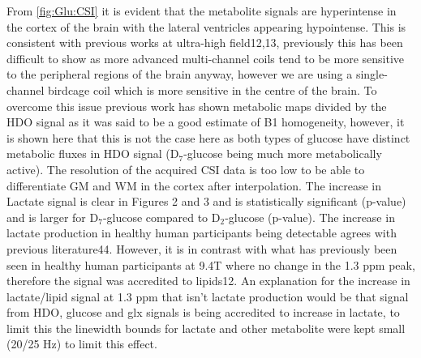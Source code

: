 \documentclass[class=article, crop=false]{standalone}
\begin{document}
From \ref{fig:Glu:CSI} it is evident that the metabolite signals are hyperintense in the cortex of the brain with the lateral ventricles appearing hypointense. This is consistent with previous works at ultra-high field12,13, previously this has been difficult to show as more advanced multi-channel coils tend to be more sensitive to the peripheral regions of the brain anyway, however we are using a single-channel birdcage coil which is more sensitive in the centre of the brain. To overcome this issue previous work has shown metabolic maps divided by the HDO signal as it was said to be a good estimate of B1 homogeneity, however, it is shown here that this is not the case here as both types of glucose have distinct metabolic fluxes in HDO signal (D$_7$-glucose being much more metabolically active). The resolution of the acquired CSI data is too low to be able to differentiate GM and WM in the cortex after interpolation. The increase in Lactate signal is clear in Figures 2 and 3 and is statistically significant (p-value) and is larger for D$_7$-glucose compared to D$_2$-glucose (p-value). The increase in lactate production in healthy human participants being detectable agrees with previous literature44. However, it is in contrast with what has previously been seen in healthy human participants at 9.4T where no change in the 1.3 ppm peak, therefore the signal was accredited to lipids12. An explanation for the increase in lactate/lipid signal at 1.3 ppm that isn’t lactate production would be that signal from HDO, glucose and glx signals is being accredited to increase in lactate, to limit this the linewidth bounds for lactate and other metabolite were kept small (20/25 Hz) to limit this effect. 


\end{document}
